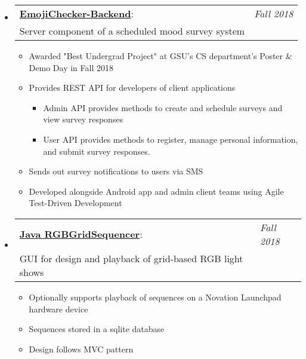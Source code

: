 \documentclass[letterpaper,11pt]{article}
\makeatletter
\newcommand{\resitem}[1]{\item #1 \vspace{-2pt}}
\newcommand{\projectheading}[3]{
\begin{tabular*}{6.5in}{l@{\extracolsep{\fill}}l}
\textbf{#1}: & \textit{#3}\\
\footnotesize{#2} 
\end{tabular*}
\vspace{-6pt}
}
\makeatother
\begin{document}
\begin{itemize}[leftmargin=*]
        \item[]{\projectheading{\href{https://github.com/slogsdon7/EmojiChecker-Backend}{EmojiChecker-Backend}}{Server component of a scheduled mood survey system}{Fall 2018}
        { \footnotesize{
        \begin{itemize}
            \resitem {Awarded "Best Undergrad Project" at GSU's CS department's Poster \& Demo Day in Fall 2018}
            \resitem {Provides REST API for developers of client applications}
            \begin{itemize}
                \item Admin API provides methods to create and schedule surveys and view survey responses
                \item User API provides methods to register, manage personal information, and submit survey responses.
            \end{itemize}
            \resitem {Sends out survey notifications to users via SMS}
            \resitem {Developed alongside Android app and admin client teams using Agile Test-Driven Development}
        \end{itemize}}
        }
        }

        \item[] {\projectheading
        {\href{https://github.com/slogsdon7/RGBGridSequencer}{Java RGBGridSequencer}}
        {GUI for design and playback of grid-based RGB light shows}{Fall 2018}
        \footnotesize{
        \begin{itemize}
            \resitem {Optionally supports playback of sequences on a Novation Launchpad hardware device}
            \resitem {Sequences stored in a sqlite database}
            \resitem {Design follows MVC pattern}
        \end{itemize}
        }
        }

        
    \end{itemize}
   
\end{document}
